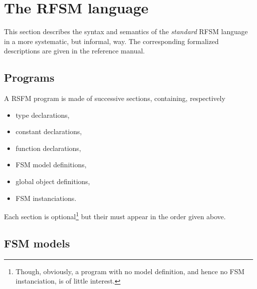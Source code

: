 \chapter{The RFSM language}
\label{cha:language}

This section describes the syntax and semantics of the \emph{standard} RFSM language in a more
systematic, but informal, way. The corresponding formalized descriptions are given in the reference
manual.

\section{Programs}
\label{sec:programs}

A RSFM program is made of successive sections, containing, respectively 
\begin{itemize}
\item type declarations,
\item constant declarations,
\item function declarations,
\item FSM model definitions,
\item global object definitions,
\item FSM instanciations.
\end{itemize}

Each section is optional\footnote{Though, obviously, a program with no model definition, and hence
  no FSM instanciation, is of little interest.} but their must appear in the order given above.

\section{FSM models}
\label{sec:fsm-models}


